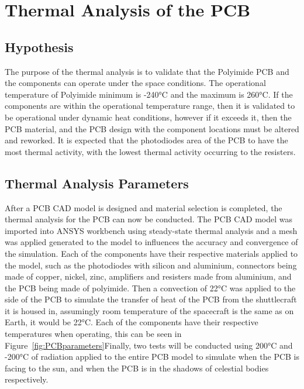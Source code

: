 \section{Thermal Analysis of the PCB}

\subsection{Hypothesis}
The purpose of the thermal analysis is to validate that the Polyimide
PCB and the components can operate under the space conditions. The
operational temperature of Polyimide minimum is -240°C and the maximum
is 260°C. If the components are within the operational temperature
range, then it is validated to be operational under dynamic heat
conditions, however if it exceeds it, then the PCB material, and the PCB
design with the component locations must be altered and reworked. It is
expected that the photodiodes area of the PCB to have the most thermal
activity, with the lowest thermal activity occurring to the resisters.

\subsection{Thermal Analysis Parameters}
After a PCB CAD model is designed and material selection is completed,
the thermal analysis for the PCB can now be conducted. The PCB CAD model
was imported into ANSYS workbench using steady-state thermal analysis
and a mesh was applied generated to the model to influences the accuracy
and convergence of the simulation. Each of the components have their
respective materials applied to the model, such as the photodiodes with
silicon and aluminium, connectors being made of copper, nickel, zinc,
amplifiers and resisters made from aluminium, and the PCB being made of
polyimide. Then a convection of 22°C was applied to the side of the PCB
to simulate the transfer of heat of the PCB from the shuttlecraft it is
housed in, assumingly room temperature of the spacecraft is the same as
on Earth, it would be 22°C. Each of the components have their respective
temperatures when operating, this can be seen in Figure~\ref{fig:PCBparameters}Finally, two tests will be conducted using
200°C and -200°C of radiation applied to the entire PCB model to
simulate when the PCB is facing to the sun, and when the PCB is in the
shadows of celestial bodies respectively.

